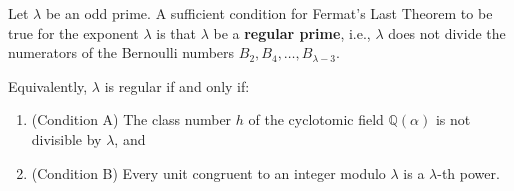 Let $\lambda$ be an odd prime. A sufficient condition for Fermat's Last Theorem to be true for the exponent $\lambda$ is that $\lambda$ be a \textbf{regular prime}, i.e., $\lambda$ does not divide the numerators of the Bernoulli numbers $B_2, B_4, \ldots, B_{\lambda-3}$.

Equivalently, $\lambda$ is regular if and only if:
\begin{enumerate}
\item (Condition A) The class number $h$ of the cyclotomic field $\mathbb{Q}(\alpha)$ is not divisible by $\lambda$, and
\item (Condition B) Every unit congruent to an integer modulo $\lambda$ is a $\lambda$-th power.
\end{enumerate}
